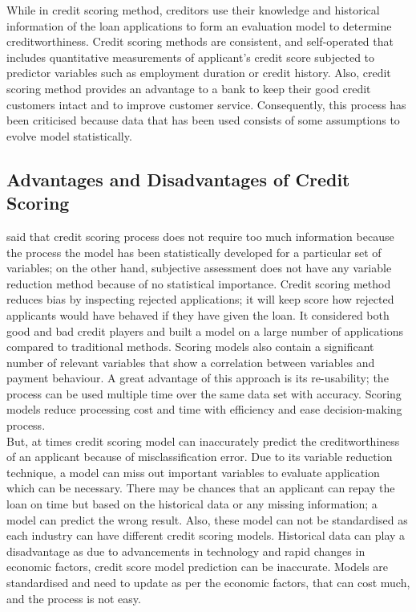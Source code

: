 {While in credit scoring method, creditors use their knowledge and historical information of the loan applications to form an evaluation model to determine creditworthiness. Credit scoring methods are consistent, and self-operated that includes quantitative measurements of applicant's credit score subjected to predictor variables such as employment duration or credit history. Also, credit scoring method provides an advantage to a bank to keep their good credit customers intact and to improve customer service. Consequently, this process has been criticised because data that has been used consists of some assumptions to evolve model statistically.\\
\subsection{Advantages and Disadvantages of Credit Scoring}
\citet{crook1996credit} said that credit scoring process does not require too much information because the process the model has been statistically developed for a particular set of variables; on the other hand, subjective assessment does not have any variable reduction method because of no statistical importance. Credit scoring method reduces bias by inspecting rejected applications; it will keep score how rejected applicants would have behaved if they have given the loan. It considered both good and bad credit players and built a model on a large number of applications compared to traditional methods. Scoring models also contain a significant number of relevant variables that show a correlation between variables and payment behaviour. A great advantage of this approach is its re-usability; the process can be used multiple time over the same data set with accuracy. Scoring models reduce processing cost and time with efficiency and ease decision-making process.\\

But, at times credit scoring model can inaccurately predict the creditworthiness of an applicant because of misclassification error. Due to its variable reduction technique, a model can miss out important variables to evaluate application which can be necessary. There may be chances that an applicant can repay the loan on time but based on the historical data or any missing information; a model can predict the wrong result. Also, these model can not be standardised as each industry can have different credit scoring models. Historical data can play a disadvantage as due to advancements in technology and rapid changes in economic factors, credit score model prediction can be inaccurate. Models are standardised and need to update as per the economic factors, that can cost much, and the process is not easy. 

}
